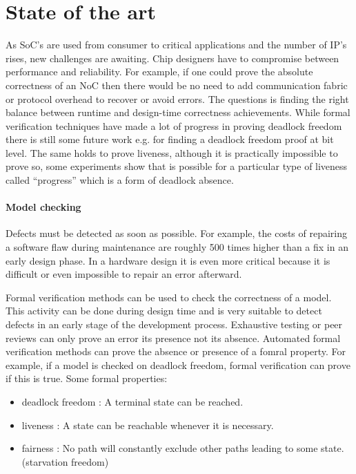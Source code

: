 \section{State of the art}

As SoC's are used from consumer to critical applications and the number of IP's
rises, new challenges are awaiting. Chip designers have to compromise between
performance and reliability. For example, if one could prove the absolute
correctness of an NoC then there would be no need to add communication fabric or
protocol overhead to recover or avoid errors. The questions is finding the right
balance between runtime and design-time correctness achievements. While formal
verification techniques have made a lot of progress in proving deadlock freedom
there is still some future work e.g. for finding a deadlock freedom proof at bit
level. The same holds to prove liveness, although it is practically impossible to
prove so, some experiments show that is possible for a particular type of
liveness called ``progress'' which is a form of deadlock absence.
\cite{Ray:2012:SPV:2492708.2492936,itp}


\paragraph{Model checking}\cite{baier2008principles}

Defects must be detected as soon as possible. For example, the costs of repairing
a software flaw during maintenance are roughly 500 times higher than a fix in an
early design phase. In a hardware design it is even more critical because it is
difficult or even impossible to repair an error afterward.

Formal verification methods can be used to check the correctness of a model.
This activity can be done during design time and is very suitable to detect
defects in an early stage of the development process. Exhaustive testing or peer
reviews can only prove an error its presence not its absence. Automated formal
verification methods can prove the absence or presence of a fomral property. For
example, if a model is checked on deadlock freedom, formal verification can
prove if this is true.
Some formal properties:

\begin{itemize}
\item deadlock freedom : A terminal state can be reached.
\item liveness : A state can be reachable whenever it is necessary.
\item fairness : No path will constantly exclude other paths leading to some
state. (starvation freedom)
\end{itemize} 

